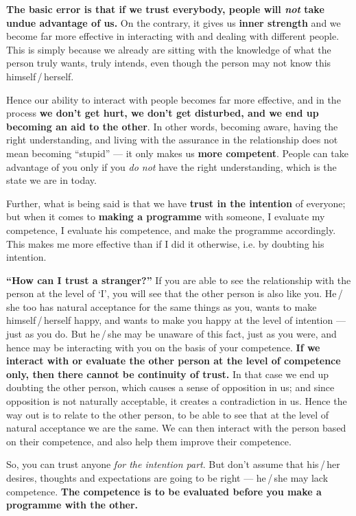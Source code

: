 \ans \textbf{The basic error is that if we trust everybody, people will
\emph{not} take undue advantage of us.} On the contrary, it gives us
\textbf{inner strength} and we become far more effective in interacting with
and dealing with different people. This is simply because we already are
sitting with the knowledge of what the person truly wants, truly intends, even
though the person may not know this himself\,/\,herself.

Hence our ability to interact with people becomes far more effective, and in
the process \textbf{we don't get hurt, we don't get disturbed, and we end up
becoming an aid to the other}. In other words, becoming aware, having the
right understanding, and living with the assurance in the relationship does
not mean becoming ``stupid'' --- it only makes us \textbf{more competent}.
People can take advantage of you only if you \emph{do not} have the right
understanding, which is the state we are in today.

Further, what is being said is that we have \textbf{trust in the intention} of
everyone; but when it comes to \textbf{making a programme} with someone, I
evaluate my competence, I evaluate his competence, and make the programme
accordingly. This makes me more effective than if I did it otherwise, i.e. by
doubting his intention.

\textbf{``How can I trust a stranger?''} If you are able to see the
relationship with the person at the level of `I', you will see that the other
person is also like you. He\,/\,she too has natural acceptance for the same
things as you, wants to make himself\,/\,herself happy, and wants to make you
happy at the level of intention --- just as you do. But he\,/\,she may be
unaware of this fact, just as you were, and hence may be interacting with you
on the basis of your competence. \textbf{If we interact with or evaluate the
other person at the level of competence only, then there cannot be continuity
of trust.} In that case we end up doubting the other person, which causes a
sense of opposition in us; and since opposition is not naturally acceptable,
it creates a contradiction in us. Hence the way out is to relate to the other
person, to be able to see that at the level of natural acceptance we are the
same. We can then interact with the person based on their competence, and also
help them improve their competence.

\begin{keybox}
So, you can trust anyone \emph{for the intention part}. But don't assume that
his\,/\,her desires, thoughts and expectations are going to be right ---
he\,/\,she may lack competence. \textbf{The competence is to be evaluated
before you make a programme with the other.}
\end{keybox}

